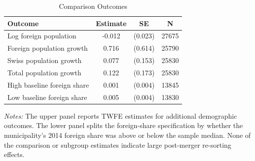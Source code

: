 \begin{table}[htbp]\centering
\caption{Comparison Outcomes}
\begin{tabular}{lccc}
\toprule
Outcome & Estimate & SE & N \\
\midrule
Log foreign population & -0.012 & (0.023) & 27675 \\
Foreign population growth & 0.716 & (0.614) & 25790 \\
Swiss population growth & 0.077 & (0.153) & 25830 \\
Total population growth & 0.122 & (0.173) & 25830 \\
\midrule
High baseline foreign share & 0.001 & (0.004) & 13845 \\
Low baseline foreign share & 0.005 & (0.004) & 13830 \\
\bottomrule
\end{tabular}
\parbox{0.95\textwidth}{\footnotesize \textit{Notes:} The upper panel reports TWFE estimates for additional demographic outcomes. The lower panel splits the foreign-share specification by whether the municipality's 2014 foreign share was above or below the sample median. None of the comparison or subgroup estimates indicate large post-merger re-sorting effects.}
\end{table}
